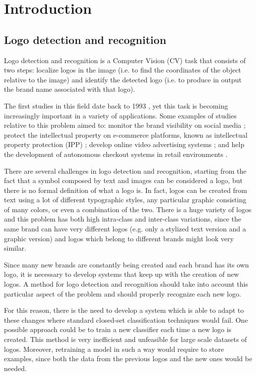\chapter{Introduction}
\label{chap:introduction}

\section{Logo detection and recognition}
\label{sec:logodet-intro}

Logo detection and recognition is a Computer Vision (CV) task that consists of two steps: localize logos in the image (i.e. to find the coordinates of the object relative to the image) and identify the detected logo (i.e. to produce in output the brand name associated with that logo).

The first studies in this field date back to 1993 \cite{doermann1993logo}, yet this task is becoming increasingly important in a variety of applications. Some examples of studies relative to this problem aimed to: monitor the brand visibility on social media \cite{7492197}; protect the intellectual property on e-commerce platforms, known as intellectual property protection (IPP) \cite{jin2020open}; develop online video advertising systems \cite{cheng2017video}; and help the development of autonomous checkout systems in retail environments \cite{mata2022standardsim}.

There are several challenges in logo detection and recognition, starting from the fact that a symbol composed by text and images can be considered a logo, but there is no formal definition of what a logo is. In fact, logos can be created from text using a lot of different typographic styles, any particular graphic consisting of many colors, or even a combination of the two.
There is a huge variety of logos and this problem has both high intra-class and inter-class variations, since the same brand can have very different logos (e.g. only a stylized text version and a graphic version) and logos which belong to different brands might look very similar.

Since many new brands are constantly being created and each brand has its own logo, it is necessary to develop systems that keep up with the creation of new logos. A method for logo detection and recognition should take into account this particular aspect of the problem and should properly recognize each new logo.

For this reason, there is the need to develop a system which is able to adapt to these changes where standard closed-set classification techniques would fail. One possible approach could be to train a new classifier each time a new logo is created. This method is very inefficient and unfeasible for large scale datasets of logos. Moreover, retraining a model in such a way would require to store examples, since both the data from the previous logos and the new ones would be needed.

